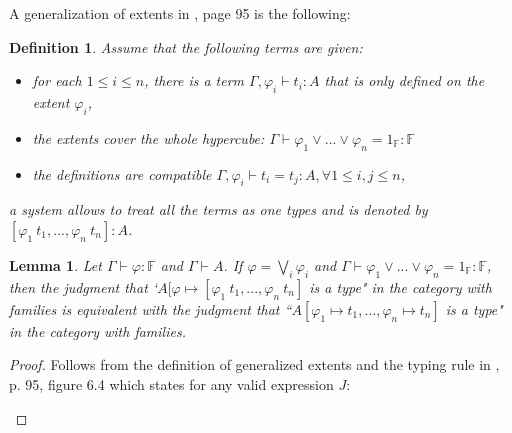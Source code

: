 \documentclass[12pt,a4paper,twoside,xetex]{book}
\newcommand{\keyword}[1]{\emph{#1}\index{#1}}
\newtheorem{lemma}[theorem]{Lemma}
\newtheorem{definition}[theorem]{Definition}
\begin{document}
\begin{prooftree}

\end{prooftree}


A generalization of extents in \cite{Huber2016}, page 95 is the following:

\begin{prooftree}
\end{prooftree}

\begin{definition}Assume that the following terms are given: 

\begin{itemize}
\item for each $1 \leq i \leq n$, there is a term  $\Gamma, \varphi_i \vdash 
t_i : A$ that is only defined on the extent $\varphi_i$, 
\item the extents cover the whole hypercube: $\Gamma \vdash \varphi_1 \vee ... 
\vee \varphi_n = 1_{\mathbb{F}} : \mathbb{F}$ 
\item the definitions are compatible $\Gamma, \varphi_i \vdash t_i = t_j : A, 
\forall 1\leq i,j\leq n$, 
\end{itemize}
a \keyword{system} allows to treat all the terms as one types and is denoted 
by $[\varphi_1 \  t_1, ..., \varphi_n \ t_n]: A$.
\end{definition}

\begin{lemma}\label{extentrewrite}
Let $\Gamma \vdash \varphi : \mathbb{F}$ and $\Gamma \vdash A$. If $\varphi = 
\bigvee_i \varphi_i$ and $\Gamma \vdash \varphi_1 \vee ... \vee \varphi_n = 
1_{\mathbb{F}} : \mathbb{F}$, then the judgment that `$A [\varphi \mapsto  
[\varphi_1 \ t_1, ..., \varphi_n \ t_n]$ is a type" in the category with 
families is equivalent with the judgment that ``$A [\varphi_1 \mapsto t_1, ..., 
\varphi_n \mapsto t_n]$ is a type" in the category with families.

\end{lemma}

\begin{proof}
Follows from the definition of generalized extents and the typing rule in 
\cite{Huber2016}, p. 95, figure 6.4 which states for any valid expression $J$: 

\begin{prooftree}
\end{prooftree}

\end{proof}
\end{document}
